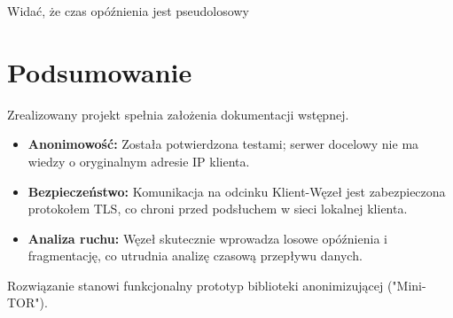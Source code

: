 \documentclass[12pt, a4paper]{article}
\begin{document}
Widać, że czas opóźnienia jest pseudolosowy

\section{Podsumowanie}
Zrealizowany projekt spełnia założenia dokumentacji wstępnej.
\begin{itemize}
    \item \textbf{Anonimowość:} Została potwierdzona testami; serwer docelowy nie ma wiedzy o oryginalnym adresie IP klienta.
    \item \textbf{Bezpieczeństwo:} Komunikacja na odcinku Klient-Węzeł jest zabezpieczona protokołem TLS, co chroni przed podsłuchem w sieci lokalnej klienta.
    \item \textbf{Analiza ruchu:} Węzeł skutecznie wprowadza losowe opóźnienia i fragmentację, co utrudnia analizę czasową przepływu danych.
\end{itemize}

Rozwiązanie stanowi funkcjonalny prototyp biblioteki anonimizującej ("Mini-TOR").
\end{document}
